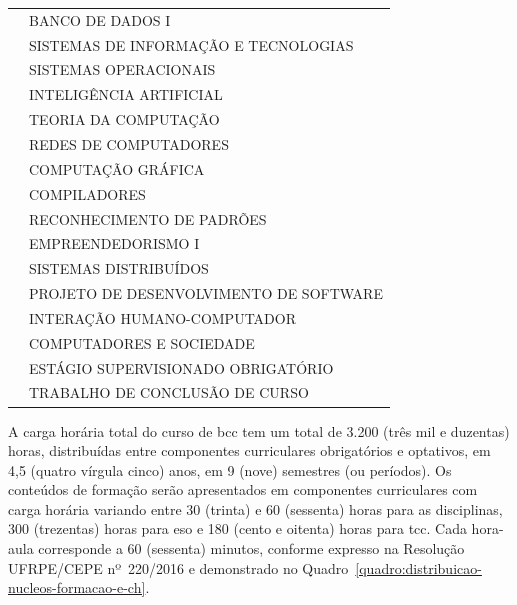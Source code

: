 \documentclass[
	12pt,				%
	openright,			%
  oneside,     %
	a4paper,			%
 hyphens,
	chapter=TITLE,		%
	english,			%
	french,				%
	spanish,			%
	brazil				%
	]{abntex2}
\begin{document}
\begin{center}
\begin{scriptsize}
\begin{longtable}{@{}lp{10cm}}
                                & BANCO DE DADOS I\\
                                & SISTEMAS DE INFORMAÇÃO E TECNOLOGIAS \\
                                & SISTEMAS OPERACIONAIS \\
                                & INTELIGÊNCIA ARTIFICIAL \\
                                & TEORIA DA COMPUTAÇÃO \\
                                & REDES DE COMPUTADORES \\
                                & COMPUTAÇÃO GRÁFICA \\
                                & COMPILADORES \\
                                & RECONHECIMENTO DE PADRÕES \\
                                & EMPREENDEDORISMO I\\
                                & SISTEMAS DISTRIBUÍDOS \\
                                & PROJETO DE DESENVOLVIMENTO DE SOFTWARE \\
                                & INTERAÇÃO HUMANO-COMPUTADOR \\
                                & COMPUTADORES E SOCIEDADE \\
                                & ESTÁGIO SUPERVISIONADO OBRIGATÓRIO \\
                                & TRABALHO DE CONCLUSÃO DE CURSO\\
      \bottomrule
      \end{longtable}
    \end{scriptsize}      
  \end{center}

A carga horária total do curso de \acrlong{bcc} tem um total de 3.200 (três mil e duzentas) horas, distribuídas entre componentes curriculares obrigatórios e optativos, em 4,5 (quatro vírgula cinco) anos, em 9 (nove) semestres (ou períodos). Os conteúdos de formação serão apresentados em componentes curriculares com carga horária variando entre 30 (trinta) e 60 (sessenta) horas para as disciplinas, 300 (trezentas) horas para \acrshort{eso} e 180 (cento e oitenta) horas para \acrshort{tcc}. Cada hora-aula corresponde a 60 (sessenta) minutos, conforme expresso na Resolução UFRPE/CEPE nº~220/2016 e demonstrado no Quadro~\ref{quadro:distribuicao-nucleos-formacao-e-ch}.
\end{document}
